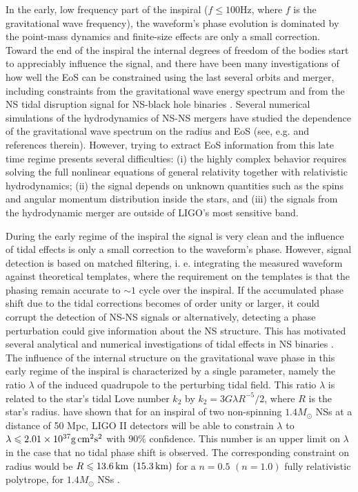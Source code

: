\documentclass[12pt,preprint]{aastex}
\begin{document}
In the early, low frequency part of the inspiral ($f\leq 100$Hz,
where $f$ is the gravitational wave frequency), the waveform's phase
evolution is dominated by the point-mass dynamics and finite-size
effects are only a small correction. Toward the end of the inspiral
the internal degrees of freedom of the bodies start to appreciably
influence the signal, and there have been many investigations of how
well the EoS can be constrained using the last several orbits and
merger, including constraints from the gravitational wave energy
spectrum \citep{faber} and from the NS tidal disruption signal for
NS-black hole binaries \citep{vallisneri}. Several numerical
simulations of the hydrodynamics of NS-NS mergers have studied the
dependence of the gravitational wave spectrum on the radius and EoS
(see, e.g. \citet{baumgarte} and references therein). However,
trying to extract EoS information from this late time regime
presents several difficulties: (i) the highly complex behavior
requires solving the full nonlinear equations of general relativity
together with relativistic hydrodynamics; (ii) the signal depends on
unknown quantities such as the spins and angular momentum
distribution inside the stars, and (iii) the signals from the
hydrodynamic merger are outside of LIGO's most sensitive band.


During the early regime of the inspiral the signal is very clean and
the influence of tidal effects is only a small correction to the
waveform's phase. However, signal detection is based on matched
filtering, i. e. integrating the measured waveform against
theoretical templates, where the requirement on the templates is
that the phasing remain accurate to $\sim 1$ cycle over the
inspiral. If the accumulated phase shift due to the tidal
corrections becomes of order unity or larger, it could corrupt the
detection of NS-NS signals or alternatively, detecting a phase
perturbation could give information about the NS structure. This has
motivated several analytical and numerical investigations of tidal
effects in NS binaries
\citep{bc,ks,kochanek,ts,mw,shibata,gualteri,pons,berti}. The
influence of the internal structure on the gravitational wave phase
in this early regime of the inspiral is characterized by a single
parameter, namely the ratio $\lambda$ of the induced
 quadrupole to the perturbing tidal field. This ratio $\lambda$ is related to
the star's tidal Love number $k_2$ by $k_2 = 3G \lambda R^{-5}/2$,
where $R$ is the star's radius. \citet{tidal} have shown that for an
inspiral of two non-spinning $1.4M_{\odot}$ NSs at a distance of 50
Mpc, LIGO II detectors will be able to constrain $\lambda$ to
$\lambda \leqslant 2.01 \times 10^{37} {\rm g}{\,}{\rm cm}^2{\rm
s}^2 $ with $90\%$ confidence. This number is an upper limit on
$\lambda$ in the case that no tidal phase shift is observed. The
corresponding constraint on radius would be $R \leqslant 13.6
{\,}{\rm km} {\;}\left(15.3{\,} {\rm km} \right)$ for a $n=0.5$
$\left(n=1.0\right)$ fully relativistic polytrope, for
$1.4M_{\odot}$ NSs \citep{tidal}.
\end{document}
